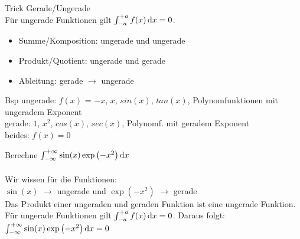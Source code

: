 \begin{KR}{Trick Gerade/Ungerade}\\
    Für ungerade Funktionen gilt $\int_{-a}^{+a} f(x) \dif x = 0$.
    \begin{itemize}
        \item Summe/Komposition: ungerade und ungerade
        \item Produkt/Quotient: ungerade und gerade
        \item Ableitung: gerade $\longrightarrow$ ungerade
    \end{itemize}
    Bsp ungerade: $f(x)$ = $-x$, $x$, $sin(x)$, $tan(x)$, Polynomfunktionen mit ungeradem Exponent\\
    gerade: $1$, $x^2$, $cos(x)$, $sec(x)$, Polynomf. mit geradem Exponent\\
    beides: $f(x) = 0$
\end{KR}

\begin{example}
	Berechne $\int_{-\infty}^{+\infty} \sin(x)\exp\left(-x^2\right) \dif x$\\ \\
	Wir wissen für die Funktionen:\\
        $\sin(x)$ $\to$ ungerade und $\exp(-x^2)$ $\to$ gerade\\ 
	Das Produkt einer ungeraden und geraden Funktion ist eine ungerade Funktion.\\
	Für ungerade Funktionen gilt $\int_{-a}^{+a} f(x) \dif x = 0$. Daraus folgt: 
	$\int_{-\infty}^{+\infty} \sin(x)\exp\left(-x^2\right) \dif x = 0$
\end{example}





